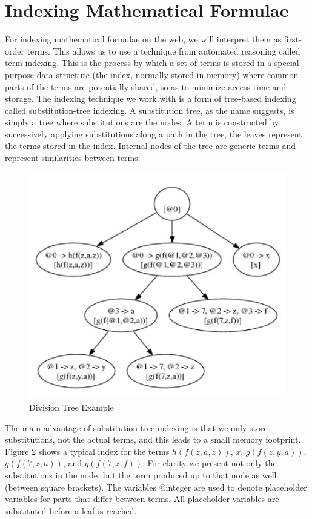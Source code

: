 \documentclass{deliverablereport}
\begin{document}
\section{Indexing Mathematical Formulae}\label{sec:mathindex}

For indexing mathematical formulae on the web, we will interpret them as first-order
terms. This allows us to use a technique from automated reasoning called term
indexing. This is the process by which a set of terms is stored in a special purpose data
structure (the index, normally stored in memory) where common parts of the terms are
potentially shared, so as to minimize access time and storage. The indexing technique we
work with is a form of tree-based indexing called substitution-tree indexing. A
substitution tree, as the name suggests, is simply a tree where substitutions are the
nodes. A term is constructed by successively applying substitutions along a path in the
tree, the leaves represent the terms stored in the index. Internal nodes of the tree are
generic terms and represent similarities between terms.

\begin{figure}[h]
\centering
 \includegraphics[scale=0.9]{figure1.jpg}
 \caption{Division Tree Example}
\end{figure}

The main advantage of substitution tree indexing is that we only store substitutions, not
the actual terms, and this leads to a small memory footprint. Figure 2 shows a typical
index for the terms $h(f(z, a, z))$, $x$, $g(f(z, y, a))$, $g(f(7, z, a))$, and
$g(f(7, z, f))$. For clarity we present not only the substitutions in the node, but the
term produced up to that node as well (between square brackets). The variables @integer
are used to denote placeholder variables for parts that differ between terms. All
placeholder variables are substituted before a leaf is reached.
\end{document}
